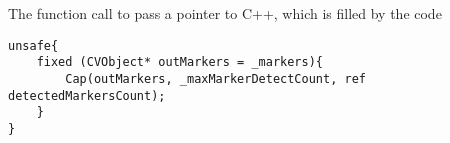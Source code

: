 \begin{listing}[H]
 	\caption{The function call to pass a pointer to C++, which is filled by the code}
 	\label{listing:pointer}
 	\begin{verbatim}
unsafe{
	fixed (CVObject* outMarkers = _markers){
		Cap(outMarkers, _maxMarkerDetectCount, ref detectedMarkersCount);
	}
}
 	\end{verbatim}
\end{listing}